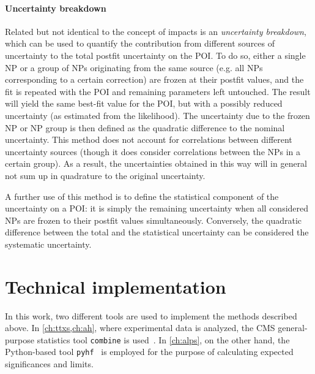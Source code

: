 \paragraph{Uncertainty breakdown} 

Related but not identical to the concept of impacts is an \textit{uncertainty breakdown}, which can be used to quantify the contribution from different sources of uncertainty to the total postfit uncertainty on the POI. To do so, either a single NP or a group of NPs originating from the same source (e.g. all NPs corresponding to a certain correction) are frozen at their postfit values, and the fit is repeated with the POI and remaining parameters left untouched. The result will yield the same best-fit value for the POI, but with a possibly reduced uncertainty (as estimated from the likelihood). The uncertainty due to the frozen NP or NP group is then defined as the quadratic difference to the nominal uncertainty.
This method does not account for correlations between different uncertainty sources (though it does consider correlations between the NPs in a certain group). As a result, the uncertainties obtained in this way will in general not sum up in quadrature to the original uncertainty. 

A further use of this method is to define the statistical component of the uncertainty on a POI: it is simply the remaining uncertainty when all considered NPs are frozen to their postfit values simultaneously. Conversely, the quadratic difference between the total and the statistical uncertainty can be considered the systematic uncertainty.

\section{Technical implementation}
In this work, two different tools are used to implement the methods described above. In \cref{ch:ttxs,ch:ah}, where experimental data is analyzed, the CMS general-purpose statistics tool \texttt{combine} is used~\cite{CMS:CAT-23-001}. In \cref{ch:alps}, on the other hand, the Python-based tool \texttt{pyhf}~\cite{pyhf_joss} is employed for the purpose of calculating expected significances and limits.



